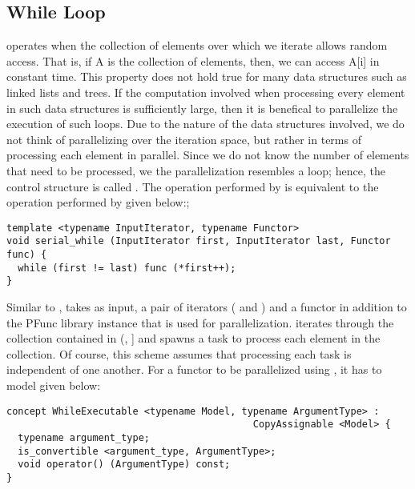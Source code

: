 \subsection{While Loop}
\label{subsec:while}
%
 operates when the collection of elements over which
we iterate allows random access. 
%
That is, if A is the collection of elements, then, we can access A[i] in
constant time. 
%
This property does not hold true for many data structures such as linked lists
and trees. 
%
If the computation involved when processing every element in such data
structures is sufficiently large, then it is benefical to parallelize the
execution of such loops.
%
Due to the nature of the data structures involved, we do not think of 
parallelizing over the iteration space, but rather in terms of processing 
each element in parallel. 
%
Since we do not know the number of elements that need to be processed, we the 
parallelization resembles a  loop; hence, the control structure 
is called .
%
The operation performed by  is equivalent to the 
operation performed by  given below:;
%
\begin{center}
\begin{minipage}{0.7\textwidth}
\begin{lstlisting}
template <typename InputIterator, typename Functor>
void serial_while (InputIterator first, InputIterator last, Functor func) {
  while (first != last) func (*first++);
}
\end{lstlisting}
\end{minipage}
\end{center}
%
Similar to ,  takes as input, a pair
of iterators ( and ) and a functor in addition to the
PFunc library instance that is used for parallelization.
%
 iterates through the collection contained in
(, ] and spawns a task to process each element in 
the collection.
%
Of course, this scheme assumes that processing each task is independent of one
another.
%
For a functor to be parallelized using , it has to 
model  given below:
%
\begin{center}
\begin{minipage}{0.7\textwidth}
\begin{lstlisting}
concept WhileExecutable <typename Model, typename ArgumentType> : 
                                           CopyAssignable <Model> {
  typename argument_type;
  is_convertible <argument_type, ArgumentType>;
  void operator() (ArgumentType) const;
}
\end{lstlisting}
\end{minipage}
\end{center}
